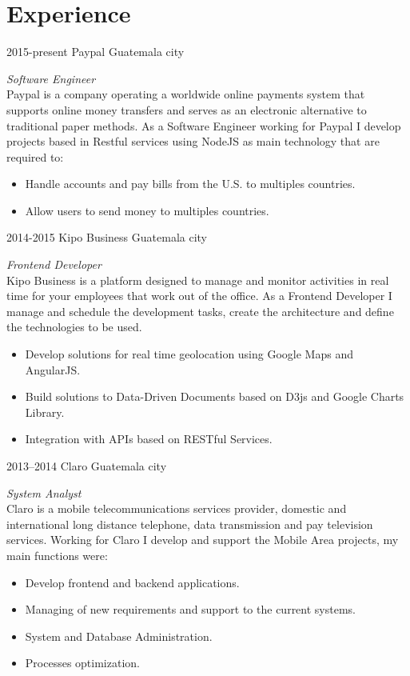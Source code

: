 \documentclass[]{friggeri-cv} %
\begin{document}
\section{Experience}
\begin{entrylist}
\entry
	{2015-present}
	{Paypal}
	{Guatemala city}
	{
		\emph{Software Engineer} \\
		Paypal is a company operating a worldwide online payments system that supports online money transfers
		and serves as an electronic alternative to traditional paper methods. As a Software Engineer working for
		Paypal I develop projects based in Restful services using NodeJS as main technology that are required to:

		\begin{itemize}
			\item Handle accounts and pay bills from the U.S. to multiples countries.
			\item Allow users to send money to multiples countries.
		\end{itemize}
	}

\entry
	{2014-2015}
	{Kipo Business}
	{Guatemala city}
	{
		\emph{Frontend Developer} \\
		Kipo Business is a platform designed to manage and monitor activities in real time for your employees that
		work out of the office. As a Frontend Developer I manage and schedule the development tasks, create the 
		architecture and define the technologies to be used.

		\begin{itemize}
			\item Develop solutions for real time geolocation using Google Maps and AngularJS.
			\item Build solutions to Data-Driven Documents based on D3js and Google Charts Library.
			\item Integration with APIs based on RESTful Services.
		\end{itemize}
	}
	
\entry
	{2013--2014}
	{Claro}
	{Guatemala city}
	{
		\emph{System Analyst} \\
		Claro is a mobile telecommunications services provider, domestic and international
		long distance telephone, data transmission and pay television services. Working for Claro I develop and support 
		the Mobile Area projects, my main functions were:

		\begin{itemize}
			\item Develop frontend and backend applications.
			\item Managing of new requirements and support to the current systems.
			\item System and Database Administration.
			\item Processes optimization.
		\end{itemize}
	}

\end{entrylist}
\end{document}
